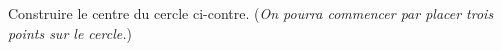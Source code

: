 \documentclass[exercice]{thedocument}%
\begin{document}
%
    \begin{minipage}[c]{0.45\textwidth}
        Construire le centre du cercle ci-contre. (\textit{On
        pourra commencer par placer trois points sur le cercle.})
    \end{minipage}
    \begin{minipage}[c]{0.45\textwidth}
        \begin{center}
        \end{center}
    \end{minipage}
\end{document}
